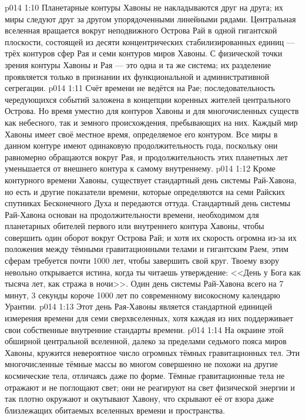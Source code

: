 \vs p014 1:10 Планетарные контуры Хавоны не накладываются друг на друга; их миры следуют друг за другом упорядоченными линейными рядами. Центральная вселенная вращается вокруг неподвижного Острова Рай в одной гигантской плоскости, состоящей из десяти концентрических стабилизированных единиц --- трёх контуров сфер Рая и семи контуров миров Хавоны. С физической точки зрения контуры Хавоны и Рая --- это одна и та же система; их разделение проявляется только в признании их функциональной и административной сегрегации.
\vs p014 1:11 \pc Счёт времени не ведётся на Рае; последовательность чередующихся событий заложена в концепции коренных жителей центрального Острова. Но время уместно для контуров Хавоны и для многочисленных существ как небесного, так и земного происхождения, пребывающих на них. Каждый мир Хавоны имеет своё местное время, определяемое его контуром. Все миры в данном контуре имеют одинаковую продолжительность года, поскольку они равномерно обращаются вокруг Рая, и продолжительность этих планетных лет уменьшается от внешнего контура к самому внутреннему.
\vs p014 1:12 Кроме контурного времени Хавоны, существует стандартный день системы Рай\hyp{}Хавона, но есть и другие показатели времени, которые определяются на семи Райских спутниках Бесконечного Духа и передаются оттуда. Стандартный день системы Рай\hyp{}Хавона основан на продолжительности времени, необходимом для планетарных обителей первого или внутреннего контура Хавоны, чтобы совершить один оборот вокруг Острова Рай; и хотя их скорость огромна из\hyp{}за их положения между тёмными гравитационными телами и гигантским Раем, этим сферам требуется почти 1000 лет, чтобы завершить свой круг. Твоему взору невольно открывается истина, когда ты читаешь утверждение: <<День у Бога как тысяча лет, как стража в ночи>>. Один день системы Рай\hyp{}Хавона всего на 7 минут, 3 секунды короче 1000 лет по современному високосному календарю Урантии.
\vs p014 1:13 Этот день Рая\hyp{}Хавоны является стандартной единицей измерения времени для семи сверхвселенных, хотя каждая из них поддерживает свои собственные внутренние стандарты времени.
\vs p014 1:14 \pc На окраине этой обширной центральной вселенной, далеко за пределами седьмого пояса миров Хавоны, кружится невероятное число огромных тёмных гравитационных тел. Эти многочисленные тёмные массы во многом совершенно не похожи на другие космические тела, отличаясь даже по форме. Тёмные гравитационные тела не отражают и не поглощают свет; они не реагируют на свет физической энергии и так плотно окружают и окутывают Хавону, что скрывают её от взора даже близлежащих обитаемых вселенных времени и пространства.
